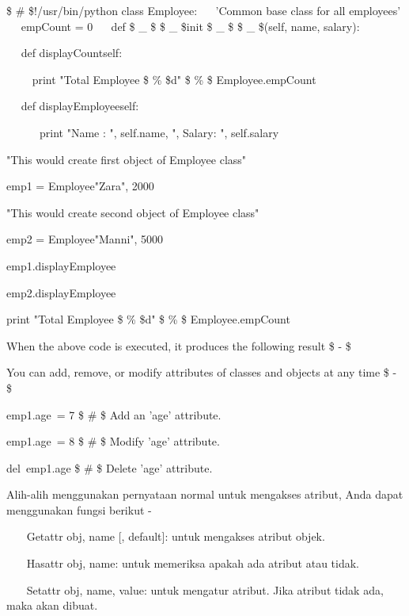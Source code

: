  \$  \#  \$!/usr/bin/python 
class Employee: 
~~ 'Common base class for all employees' 
~~ empCount = 0 
~~ def  \$  \_  \$ \$  \_  \$init \$  \_  \$ \$  \_  \$(self, name, salary): 
\item 
~~ def displayCount{self}: 
\item 
~~~~ print "Total Employee  \$  \%  \$d"  \$  \%  \$ Employee.empCount 
\begin{12pt}
\item 
~~ def displayEmployee{self}: 
\item 
~~~~~~print "Name : ", self.name,  ", Salary: ", self.salary 
\begin{12pt}
\item
"This would create first object of Employee class" 
\item 
emp1 = Employee{"Zara", 2000} 
\item 
"This would create second object of Employee class"
\item
emp2 = Employee{"Manni", 5000} 
\item
emp1.displayEmployee{} 
\item
emp2.displayEmployee{} 
\item
print "Total Employee  \$  \%  \$d"  \$  \%  \$ Employee.empCount \par
\item
When the above code is executed, it produces the following result  \$ - \$ \par
You can add, remove, or modify attributes of classes and objects at any time  \$ - \$ \par
\noindent 
emp1.age~= 7   \$  \#  \$ Add an 'age' attribute. \par
\noindent 
emp1.age~= 8   \$  \#  \$ Modify 'age' attribute. \par
\noindent 
del~emp1.age   \$  \#  \$ Delete 'age' attribute. \par
\vspace{12pt}
Alih-alih menggunakan pernyataan normal untuk mengakses atribut, Anda dapat menggunakan fungsi berikut - \par
\vspace{12pt}
\noindent 
~~~ Getattr {obj, name [, default]}: untuk mengakses atribut objek. \par
\vspace{12pt}
\noindent 
~~~ Hasattr {obj, name}: untuk memeriksa apakah ada atribut atau tidak. \par
\vspace{12pt}
\noindent 
~~~ Setattr {obj, name, value}: untuk mengatur atribut. Jika atribut tidak ada, maka akan dibuat. \par

\end{12pt}
\end{12pt}
